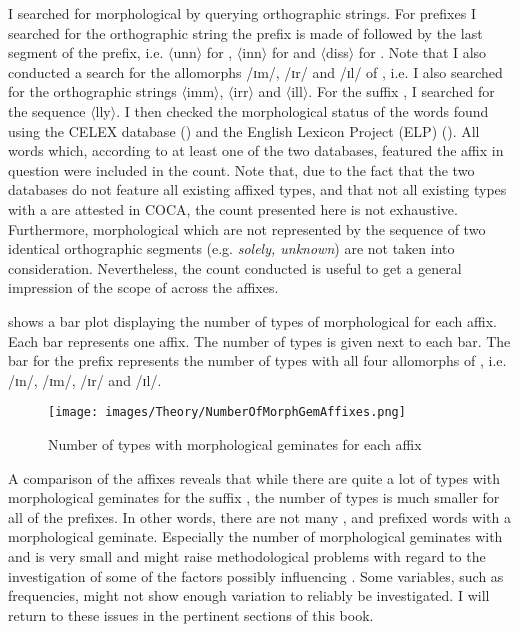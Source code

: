 I searched for morphological  by querying orthographic strings. For prefixes I searched for the orthographic string the prefix is made of followed by the last segment of the prefix, i.e. $\langle$unn$\rangle$ for ,  $\langle$inn$\rangle$ for  and  $\langle$diss$\rangle$ for . Note that I also conducted a search for the allomorphs /ɪm/, /ɪr/ and /ɪl/ of , i.e. I also searched for the orthographic strings  $\langle$imm$\rangle$, $\langle$irr$\rangle$ and $\langle$ill$\rangle$.  For the suffix , I searched for the sequence $\langle$lly$\rangle$.  I then checked the morphological status of the words found using the {CELEX} database (\citealt{Baayen.1995}) and the {English Lexicon Project (ELP)} (\citealt{Balota.2007}). All words which, according to at least one of the two databases, featured the affix in question were included in the count. 
Note that, due to the fact that the two databases do not feature all existing affixed types, and that not all existing types with a  are attested in  {COCA}, the count presented here is not exhaustive. Furthermore, morphological  which are not represented by the sequence of two identical orthographic segments (e.g. \textit{solely, unknown}) are not taken into consideration. Nevertheless, the count conducted is useful to get a general impression of the scope of  across the affixes.
 
  shows a bar plot displaying the number of types of morphological  for each affix. Each bar represents one affix. The number of types is given next to each bar. The bar for the prefix   represents the number of types with all four allomorphs of , i.e. /ɪn/, /ɪm/, /ɪr/ and /ɪl/. 
 
\begin{figure*}  
	\texttt{[image: images/Theory/NumberOfMorphGemAffixes.png]}
	\caption{Number of types with morphological geminates for each affix\label{fig:morphological geminates for each affix}}
\end{figure*}

A comparison of the affixes reveals that while there are quite a lot of types with morphological geminates for the suffix , the number of types is much smaller for all of the prefixes. In other words, there are not many ,  and prefixed words with a {morphological geminate}. Especially the number of morphological geminates with  and  is very small and might raise methodological problems with regard to the investigation of some of the factors possibly influencing . Some variables, such as frequencies, might not show enough variation to reliably be investigated. I will return to these issues in the pertinent sections of this book.

